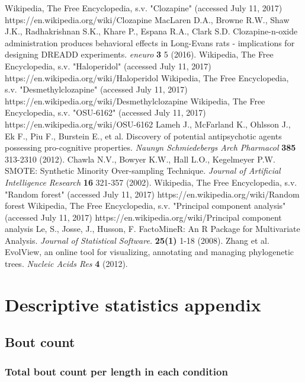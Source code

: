 \documentclass[a4paper,12pt]{article}
\begin{document}
\begin{thebibliography}{99}
Wikipedia, The Free Encyclopedia, s.v.  "Clozapine" (accessed July 11, 2017) https://en.wikipedia.org/wiki/Clozapine
MacLaren D.A., Browne R.W., Shaw J.K., Radhakrishnan S.K., Khare P., Espana R.A., Clark S.D. Clozapine-n-oxide administration produces behavioral effects in Long-Evans rats - implications for designing DREADD experiments. \textit{eneuro} \textbf{3} 5 (2016).
Wikipedia, The Free Encyclopedia, s.v.  "Haloperidol" (accessed July 11, 2017) https://en.wikipedia.org/wiki/Haloperidol
Wikipedia, The Free Encyclopedia, s.v.  "Desmethylclozapine" (accessed July 11, 2017) https://en.wikipedia.org/wiki/Desmethylclozapine
Wikipedia, The Free Encyclopedia, s.v.  "OSU-6162" (accessed July 11, 2017) https://en.wikipedia.org/wiki/OSU-6162
Lameh J., McFarland K., Ohlsson J., Ek F., Piu F., Burstein E., et al. Discovery of potential antipsychotic agents possessing pro-cognitive properties. \textit{Naunyn Schmiedebergs Arch Pharmacol} \textbf{385} 313-2310 (2012).
Chawla N.V., Bowyer K.W., Hall L.O., Kegelmeyer P.W. SMOTE: Synthetic Minority Over-sampling Technique. \textit{Journal of Artificial Intelligence Research} \textbf{16} 321-357 (2002).
Wikipedia, The Free Encyclopedia, s.v.  "Random forest" (accessed July 11, 2017) https://en.wikipedia.org/wiki/Random forest
Wikipedia, The Free Encyclopedia, s.v.  "Principal component analysis" (accessed July 11, 2017) https://en.wikipedia.org/wiki/Principal component analysis
Le, S., Josse, J., Husson, F. FactoMineR: An R Package for Multivariate Analysis. \textit{Journal of Statistical Software.} \textbf{25(1)} 1-18 (2008).
Zhang et al. EvolView, an online tool for visualizing, annotating and managing phylogenetic trees. \textit{Nucleic Acids Res} \textbf{4} (2012).
\end{thebibliography}


\appendix
\newpage
\section{Descriptive statistics appendix}
\subsection{Bout count}

\subsubsection{Total bout count per length in each condition}
\end{document}
